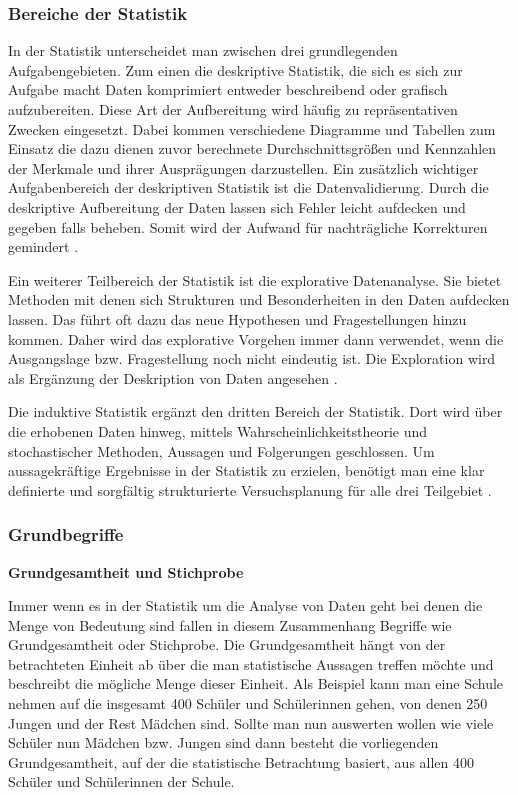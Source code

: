 \subsubsection{Bereiche der Statistik}
In der Statistik unterscheidet man zwischen drei grundlegenden Aufgabengebieten. Zum einen die deskriptive Statistik, die sich es sich zur Aufgabe macht Daten komprimiert entweder beschreibend oder grafisch aufzubereiten. Diese Art der Aufbereitung wird häufig zu repräsentativen Zwecken eingesetzt. Dabei kommen verschiedene Diagramme und Tabellen zum Einsatz die dazu dienen zuvor berechnete Durchschnittsgrößen und Kennzahlen der Merkmale und ihrer Ausprägungen darzustellen. Ein zusätzlich wichtiger Aufgabenbereich der deskriptiven Statistik ist die Datenvalidierung. Durch die deskriptive Aufbereitung der Daten lassen sich Fehler leicht aufdecken und gegeben falls beheben. Somit wird der Aufwand für nachträgliche Korrekturen gemindert \citep[vgl.][10\psq]{Fahrmeir2016}.

Ein weiterer Teilbereich der Statistik ist die explorative Datenanalyse. Sie bietet Methoden mit denen sich Strukturen und Besonderheiten in den Daten aufdecken lassen. Das führt oft dazu das neue Hypothesen und Fragestellungen hinzu kommen. Daher wird das explorative Vorgehen immer dann verwendet, wenn die Ausgangslage bzw. Fragestellung noch nicht eindeutig ist. Die Exploration wird als Ergänzung der Deskription von Daten angesehen \citep[vgl.][11\psq]{Fahrmeir2016}.

Die induktive Statistik ergänzt den dritten Bereich der Statistik. Dort wird über die erhobenen Daten hinweg, mittels Wahrscheinlichkeitstheorie und stochastischer Methoden, Aussagen und Folgerungen geschlossen. Um aussagekräftige Ergebnisse in der Statistik zu erzielen, benötigt man eine klar definierte und sorgfältig strukturierte Versuchsplanung für alle drei Teilgebiet \citep[vgl.][12]{Fahrmeir2016}.

\subsubsection{Grundbegriffe}
\textbf{Grundgesamtheit und Stichprobe}

Immer wenn es in der Statistik um die Analyse von Daten geht bei denen die Menge von Bedeutung sind fallen in diesem Zusammenhang Begriffe wie Grundgesamtheit oder Stichprobe. Die Grundgesamtheit hängt von der betrachteten Einheit ab über die man statistische Aussagen treffen möchte und beschreibt die mögliche Menge dieser Einheit. Als Beispiel kann man eine Schule nehmen auf die insgesamt 400 Schüler und Schülerinnen gehen, von denen 250 Jungen und der Rest Mädchen sind. Sollte man nun auswerten wollen wie viele Schüler nun Mädchen bzw. Jungen sind dann besteht die vorliegenden Grundgesamtheit, auf der die statistische Betrachtung basiert, aus allen 400 Schüler und Schülerinnen der Schule.

